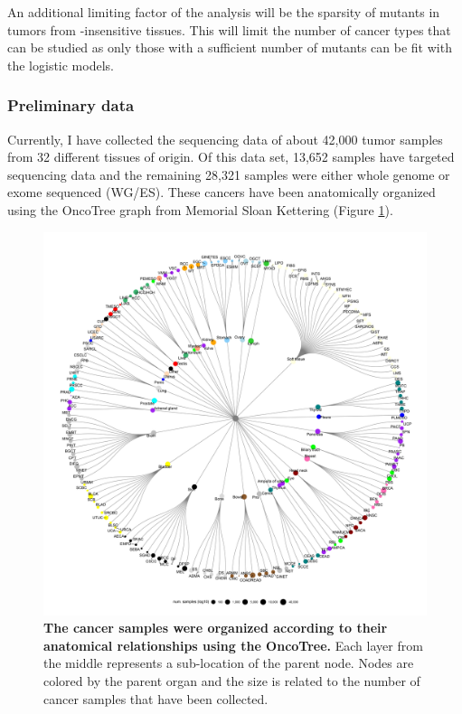 An additional limiting factor of the analysis will be the sparsity of \KRAS{} mutants in tumors from \KRAS{}-insensitive tissues.
This will limit the number of cancer types that can be studied as only those with a sufficient number of \KRAS{} mutants can be fit with the logistic models.

\subsubsection*{Preliminary data}

Currently, I have collected the sequencing data of about 42,000 tumor samples from 32 different tissues of origin.
Of this data set, 13,652 samples have targeted sequencing data and the remaining 28,321 samples were either whole genome or exome sequenced (WG/ES).
These cancers have been anatomically organized using the OncoTree graph from Memorial Sloan Kettering (Figure \ref{fig:oncotree}).

\begin{figure}[t!]
\centering
\includegraphics[width=180mm]{figures/aim2/oncotree_figure.jpg}
\caption{
    \textbf{The cancer samples were organized according to their anatomical relationships using the OncoTree.}
    Each layer from the middle represents a sub-location of the parent node.
    Nodes are colored by the parent organ and the size is related to the number of cancer samples that have been collected.
}
\label{fig:oncotree}
\end{figure}

